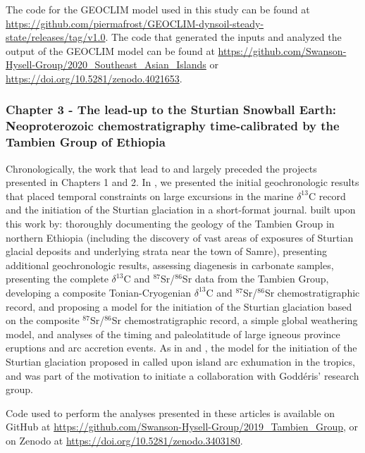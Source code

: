 \documentclass{ucbthesis}
\newcommand{\dC}{$\delta^{13}$C\xspace}
\newcommand{\SrSr}{$^{87}$Sr/$^{86}$Sr\xspace}
\begin{document}
\begin{frontmatter}
\begin{preface}
The code for the GEOCLIM model used in this study can be found at \url{https://github.com/piermafrost/GEOCLIM-dynsoil-steady-state/releases/tag/v1.0}. The code that generated the inputs and analyzed the output of the GEOCLIM model can be found at \url{https://github.com/Swanson-Hysell-Group/2020_Southeast_Asian_Islands} or \url{https://doi.org/10.5281/zenodo.4021653}.

\subsubsection*{Chapter 3 - The lead-up to the Sturtian Snowball Earth: Neoproterozoic chemostratigraphy time-calibrated by the Tambien Group of Ethiopia}

\noindent
{}

\medskip

\noindent
{}

\bigskip

Chronologically, the work that lead to \citet{MacLennan2018a} and \citet{Park2020a} largely preceded the projects presented in Chapters 1 and 2. In \citet{MacLennan2018a}, we presented the initial geochronologic results that placed temporal constraints on large excursions in the marine \dC record and the initiation of the Sturtian glaciation in a short-format journal. \citet{Park2020a} built upon this work by: thoroughly documenting the geology of the Tambien Group in northern Ethiopia (including the discovery of vast areas of exposures of Sturtian glacial deposits and underlying strata near the town of Samre), presenting additional geochronologic results, assessing diagenesis in carbonate samples, presenting the complete \dC and \SrSr data from the Tambien Group, developing a composite Tonian-Cryogenian \dC and \SrSr chemostratigraphic record, and proposing a model for the initiation of the Sturtian glaciation based on the composite \SrSr chemostratigraphic record, a simple global weathering model, and analyses of the timing and paleolatitude of large igneous province eruptions and arc accretion events. As in \citet{Swanson-Hysell2017a} and \citet{Macdonald2019a}, the model for the initiation of the Sturtian glaciation proposed in \citet{Park2020a} called upon island arc exhumation in the tropics, and was part of the motivation to initiate a collaboration with Godd\'eris' research group.

Code used to perform the analyses presented in these articles is available on GitHub at \url{https://github.com/Swanson-Hysell-Group/2019_Tambien_Group}, or on Zenodo at \url{https://doi.org/10.5281/zenodo.3403180}.


\end{preface}
\end{frontmatter}
\end{document}
